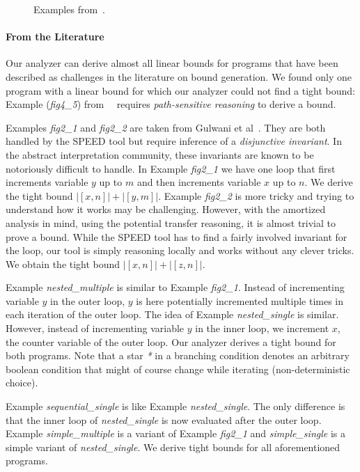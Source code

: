 \documentclass{sigplanconf}
\begin{document}
{\begin{figure}
   \caption{Examples from~\cite{GulwaniZ10}.}
  \label{fig:cat3a}
\end{figure}


\paragraph{From  the Literature}

Our analyzer can derive almost all linear bounds for programs that
have been described as challenges in the literature on bound
generation.  We found only one program with a linear bound for
which our analyzer could not find a tight bound:  Example
(\emph{fig4\_5}) from~~\cite{GulwaniJK09} requires \emph{path-sensitive
  reasoning} to derive a bound.

Examples \emph{fig2\_1} and \emph{fig2\_2} are taken from Gulwani et
al~\cite{GulwaniMC09}.  They are both handled by the SPEED tool but
require inference of a \emph{disjunctive invariant}.  In the abstract
interpretation community, these invariants are known to be notoriously
difficult to handle.
%
In Example \emph{fig2\_1} we have one loop that first increments
variable $y$ up to $m$ and then increments variable $x$ up to $n$.  We
derive the tight bound $|[x, n]| + |[y, m]|$.
%
Example \emph{fig2\_2} is more tricky and trying to understand how it
works may be challenging.  However, with the amortized analysis in
mind, using the potential transfer reasoning, it is almost trivial to
prove a bound.  While the SPEED tool has to find a fairly
involved invariant for the loop, our tool is simply reasoning locally
and works without any clever tricks. We obtain the tight bound $|[x,
n]| + |[z, n]|$.

Example \emph{nested\_multiple} is similar to Example \emph{fig2\_1}.
Instead of incrementing variable $y$ in the outer loop, $y$ is here
potentially incremented multiple times in each iteration of the outer
loop.  The idea of Example \emph{nested\_single} is similar.  However,
instead of incrementing variable $y$ in the inner loop, we increment
$x$, the counter variable of the outer loop. Our analyzer derives a
tight bound for both programs.  Note that a star \emph{*} in a
branching condition denotes an arbitrary boolean condition that might
of course change while iterating (non-deterministic choice).

Example \emph{sequential\_single} is like Example
\emph{nested\_single}.  The only difference is that the inner loop of
\emph{nested\_single} is now evaluated after the outer loop.  Example
\emph{simple\_multiple} is a variant of Example \emph{fig2\_1} and
\emph{simple\_single} is a simple variant of \emph{nested\_single}.
We derive tight bounds for all aforementioned programs.

}
\end{document}
